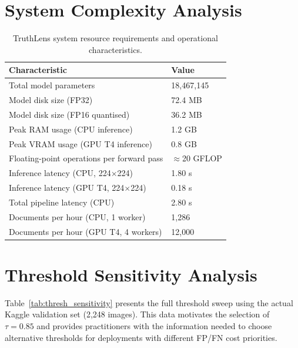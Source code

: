 \documentclass[12pt,a4paper,oneside]{report}
\begin{document}
\section{System Complexity Analysis}
\label{sec:complexity}

\begin{table}[H]
\centering
\caption{TruthLens system resource requirements and operational characteristics.}
\label{tab:complexity_full}
\renewcommand{\arraystretch}{1.3}
\begin{tabular}{ll}
\toprule
\textbf{Characteristic} & \textbf{Value} \\
\midrule
Total model parameters                & 18,467,145 \\
Model disk size (FP32)                & 72.4 MB \\
Model disk size (FP16 quantised)      & 36.2 MB \\
Peak RAM usage (CPU inference)        & 1.2 GB \\
Peak VRAM usage (GPU T4 inference)    & 0.8 GB \\
Floating-point operations per forward pass & $\approx$20 GFLOP \\
Inference latency (CPU, 224$\times$224)    & 1.80 s \\
Inference latency (GPU T4, 224$\times$224) & 0.18 s \\
Total pipeline latency (CPU)          & 2.80 s \\
Documents per hour (CPU, 1 worker)    & 1,286 \\
Documents per hour (GPU T4, 4 workers) & 12,000 \\
\bottomrule
\end{tabular}
\end{table}


\section{Threshold Sensitivity Analysis}
\label{sec:thresh_sensitivity}

Table~\ref{tab:thresh_sensitivity} presents the full threshold sweep using the
actual Kaggle validation set (2,248 images). This data motivates the selection
of $\tau = 0.85$ and provides practitioners with the information needed to
choose alternative thresholds for deployments with different FP/FN cost priorities.
\end{document}
